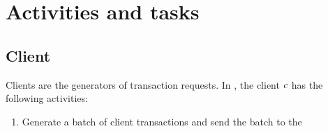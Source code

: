 \section{Activities and tasks}

\subsection{Client}

\par Clients are the generators of transaction requests. In \RCC{}, the client $\Client{}$ has the following activities:

\begin{enumerate}
    \item Generate a batch of client transactions and send the batch to the 
\end{enumerate}
